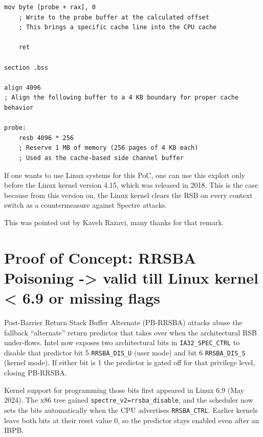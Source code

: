 \documentclass[11pt,a4paper]{article}
\begin{document}
\begin{lstlisting}[caption={\texttt{attacker\_rsb\_poisoning.asm}}]
    mov byte [probe + rax], 0
    ; Write to the probe buffer at the calculated offset
    ; This brings a specific cache line into the CPU cache

    ret

section .bss

align 4096
; Align the following buffer to a 4 KB boundary for proper cache behavior

probe:
    resb 4096 * 256
    ; Reserve 1 MB of memory (256 pages of 4 KB each)
    ; Used as the cache-based side channel buffer
\end{lstlisting}

If one wants to use Linux systems for this PoC, one can use this exploit only before the Linux kernel version 4.15, which was released in 2018. This is the case because from this version on, the Linux kernel clears the RSB on every context switch as a countermeasure against Spectre attacks.\cite{kernel}

This was pointed out by Kaveh Razavi, many thanks for that remark.

\section{Proof of Concept: RRSBA Poisoning -> valid till Linux kernel < 6.9 or missing flags}
Post‑Barrier Return Stack Buffer Alternate (PB‑RRSBA) attacks abuse the fallback “alternate” return predictor that takes over when the architectural RSB under‑flows. Intel now exposes two architectural bits in \texttt{IA32\_SPEC\_CTRL} to disable that predictor bit 5 \texttt{RRSBA\_DIS\_U} (user mode) and bit 6 \texttt{RRSBA\_DIS\_S} (kernel mode). If either bit is 1 the predictor is gated off for that privilege level, closing PB‑RRSBA.

Kernel support for programming those bits first appeared in Linux 6.9 (May 2024).  The x86 tree gained \texttt{spectre\_v2=rrsba\_disable}, and the scheduler now sets the bits automatically when the CPU advertises \texttt{RRSBA\_CTRL}. Earlier kernels leave both bits at their reset value 0, so the predictor stays enabled even after an IBPB.\\
\end{document}
